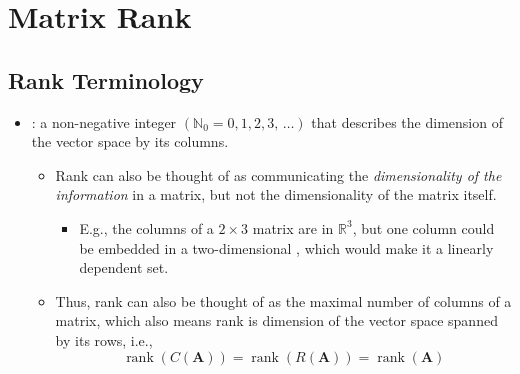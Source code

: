 \chapter{Matrix Rank}\label{Matrix Rank}
\section{Rank Terminology}\label{Rank Terminology}
\begin{itemize}
  \item {}: a non-negative integer \((\mathbb{N}_0 = 0, 1, 2, 3,\,\dots)\) that describes the dimension of the vector space \hyperref[Span]{} by its columns.
    \begin{itemize}
      \item Rank can also be thought of as communicating the \emph{dimensionality of the information} in a matrix, but not the dimensionality of the matrix itself.
      \begin{itemize}
        \item E.g., the columns of a \(2\times 3\) matrix are in \(\mathbb{R}^3\), but one column could be embedded in a two-dimensional \hyperref[Subspace]{}, which would make it a linearly dependent set.
      \end{itemize}
      \item Thus, rank can also be thought of as the maximal number of \hyperref[Linear Independence]{} columns of a matrix, which also means rank is dimension of the vector space spanned by its rows, i.e.,
      \[%
      \operatorname{rank}(C(\bm{A})) = \operatorname{rank}(R(\bm{A})) = \operatorname{rank}(\bm{A})
      \]%
    \end{itemize}
  

\end{itemize}
